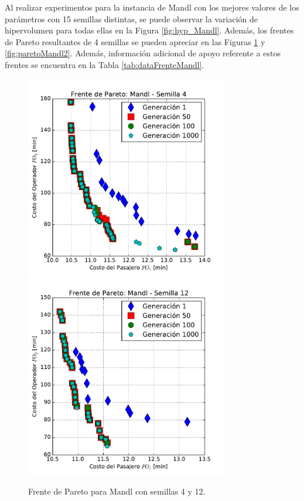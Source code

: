 Al realizar experimentos para la instancia de Mandl con los mejores valores de los parámetros con 15 semillas distintas, se puede observar la variación de hipervolumen para todas ellas en la Figura \ref{fig:hyp_Mandl}. Además, los frentes de Pareto resultantes de 4 semillas se pueden apreciar en las Figuras \ref{fig:paretoMandl1} y \ref{fig:paretoMandl2}. Además, información adicional de apoyo referente a estos frentes se encuentra en la Tabla \ref{tab:dataFrenteMandl}. 

\begin{figure}[p]
\centering
\includegraphics[width=0.79\textwidth]{img/frente_Mandl_s4}
\includegraphics[width=0.79\textwidth]{img/frente_Mandl_s12}
\caption{Frente de Pareto para Mandl con semillas 4 y 12.}
\label{fig:paretoMandl1}
\end{figure}

